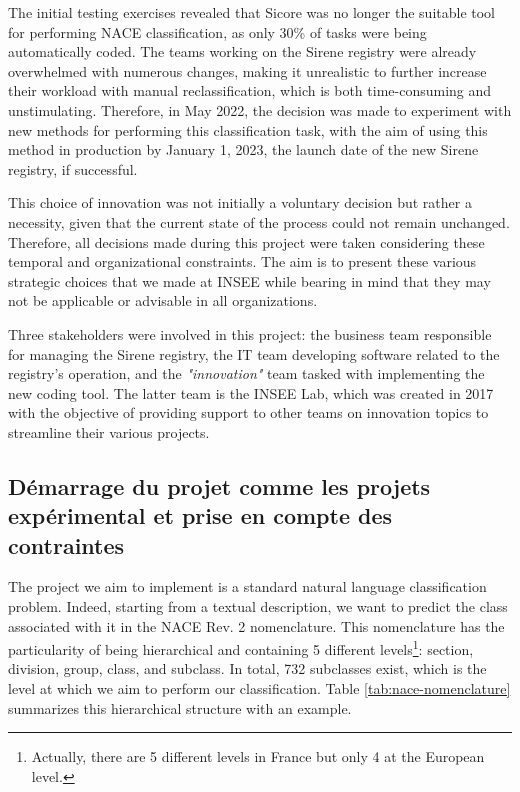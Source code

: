 The initial testing exercises revealed that Sicore was no longer the suitable tool for performing NACE classification, as only 30\% of tasks were being automatically coded. The teams working on the Sirene registry were already overwhelmed with numerous changes, making it unrealistic to further increase their workload with manual reclassification, which is both time-consuming and unstimulating. Therefore, in May 2022, the decision was made to experiment with new methods for performing this classification task, with the aim of using this method in production by January 1, 2023, the launch date of the new Sirene registry, if successful.

This choice of innovation was not initially a voluntary decision but rather a necessity, given that the current state of the process could not remain unchanged. Therefore, all decisions made during this project were taken considering these temporal and organizational constraints. The aim is to present these various strategic choices that we made at INSEE while bearing in mind that they may not be applicable or advisable in all organizations.

Three stakeholders were involved in this project: the business team responsible for managing the Sirene registry, the IT team developing software related to the registry's operation, and the \textit{"innovation"} team tasked with implementing the new coding tool. The latter team is the INSEE Lab, which was created in 2017 with the objective of providing support to other teams on innovation topics to streamline their various projects.

\subsection{Démarrage du projet comme les projets expérimental et prise en compte des contraintes}

The project we aim to implement is a standard natural language classification problem. Indeed, starting from a textual description, we want to predict the class associated with it in the NACE Rev. 2 nomenclature. This nomenclature has the particularity of being hierarchical and containing 5 different levels\footnote{Actually, there are 5 different levels in France but only 4 at the European level.}: section, division, group, class, and subclass. In total, 732 subclasses exist, which is the level at which we aim to perform our classification. Table \ref{tab:nace-nomenclature} summarizes this hierarchical structure with an example.

